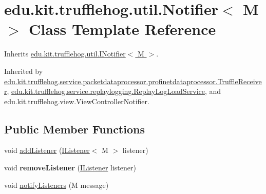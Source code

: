 \hypertarget{classedu_1_1kit_1_1trufflehog_1_1util_1_1_notifier}{}\section{edu.\+kit.\+trufflehog.\+util.\+Notifier$<$ M $>$ Class Template Reference}
\label{classedu_1_1kit_1_1trufflehog_1_1util_1_1_notifier}


Inherits \hyperlink{interfaceedu_1_1kit_1_1trufflehog_1_1util_1_1_i_notifier}{edu.\+kit.\+trufflehog.\+util.\+I\+Notifier$<$ M $>$}.



Inherited by \hyperlink{classedu_1_1kit_1_1trufflehog_1_1service_1_1packetdataprocessor_1_1profinetdataprocessor_1_1_truffle_receiver}{edu.\+kit.\+trufflehog.\+service.\+packetdataprocessor.\+profinetdataprocessor.\+Truffle\+Receiver}, \hyperlink{classedu_1_1kit_1_1trufflehog_1_1service_1_1replaylogging_1_1_replay_log_load_service}{edu.\+kit.\+trufflehog.\+service.\+replaylogging.\+Replay\+Log\+Load\+Service}, and edu.\+kit.\+trufflehog.\+view.\+View\+Controller\+Notifier.

\subsection*{Public Member Functions}
\begin{DoxyCompactItemize}
\item 
void \hyperlink{classedu_1_1kit_1_1trufflehog_1_1util_1_1_notifier_af076d7bc5d02b148215dc75674ae9aae}{add\+Listener} (\hyperlink{interfaceedu_1_1kit_1_1trufflehog_1_1util_1_1_i_listener}{I\+Listener}$<$ M $>$ listener)
\item 
\hypertarget{classedu_1_1kit_1_1trufflehog_1_1util_1_1_notifier_a12485620de54d9df7e67001661a4e2df}{}void {\bfseries remove\+Listener} (\hyperlink{interfaceedu_1_1kit_1_1trufflehog_1_1util_1_1_i_listener}{I\+Listener} listener)\label{classedu_1_1kit_1_1trufflehog_1_1util_1_1_notifier_a12485620de54d9df7e67001661a4e2df}

\item 
void \hyperlink{classedu_1_1kit_1_1trufflehog_1_1util_1_1_notifier_aedc86baa16574be2ceab61f54c786dae}{notify\+Listeners} (M message)
\end{DoxyCompactItemize}


